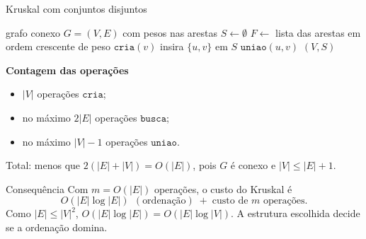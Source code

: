 \documentclass[aspectratio=169,10pt]{beamer}
\newcommand{\Cria}{\mathtt{cria}}
\newcommand{\Busca}{\mathtt{busca}}
\newcommand{\Uniao}{\mathtt{uniao}}
\begin{document}
 \begin{frame}[t]{Kruskal com conjuntos disjuntos}

   \begin{minipage}[t]{.52\linewidth}
     \small
     \begin{algorithmic}[1]
       \Require grafo conexo $G=(V,E)$ com pesos nas arestas
       \State $S\gets\emptyset$
       \State $F\gets$ lista das arestas em ordem crescente de peso
       \State $\Cria(v)$
       \EndFor
       \If{$\Busca(u)\neq\Busca(v)$}
       \State insira $\{u,v\}$ em $S$
       \State $\Uniao(u,v)$
       \EndIf
       \EndFor
       \State \Return $(V,S)$
     \end{algorithmic}
   \end{minipage}
   \hfill
   \begin{minipage}[t]{.44\linewidth}
     \textbf{Contagem das operações}
     \begin{itemize}
     \item $|V|$ operações $\Cria$;
     \item no máximo $2|E|$ operações $\Busca$;
     \item no máximo $|V|-1$ operações $\Uniao$.
     \end{itemize}
     Total: menos que $2(|E|+|V|)=O(|E|)$, pois $G$ é conexo e
     $|V|\leq|E|+1$.
   \end{minipage}
 
   \smallskip
   \begin{block}{Consequência}
     Com $m=O(|E|)$ operações, o custo do Kruskal é
     \[
       O(|E|\log|E|)\ \ (\text{ordenação})\;+\;\text{custo de }m\text{ operações}.
     \]
     Como $|E|\leq|V|^2$, $O(|E|\log|E|)=O(|E|\log|V|)$.  A estrutura
     escolhida decide se a ordenação domina.
   \end{block}
 \end{frame}
 
\end{document}
